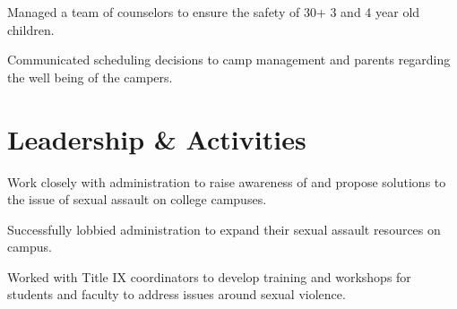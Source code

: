 \documentclass{resume}
\begin{document}
\begin{minipage}[t]{0.66\textwidth}
\begin{tightemize}
\item Managed a team of counselors to ensure the safety of 30+ 3 and 4 year old children.
\item Communicated scheduling decisions to camp management and parents regarding the well being of the campers. 
\end{tightemize}
\sectionsep


\section{Leadership \& Activities}

\begin{tightemize}
\item Work closely with administration to raise awareness of and propose solutions to the issue of sexual assault on college campuses.
\item Successfully lobbied administration to expand their sexual assault resources on campus.
\item Worked with Title IX coordinators to develop training and workshops for students and faculty to address issues around sexual violence.
\end{tightemize}
\sectionsep



\end{minipage}
\end{document}
